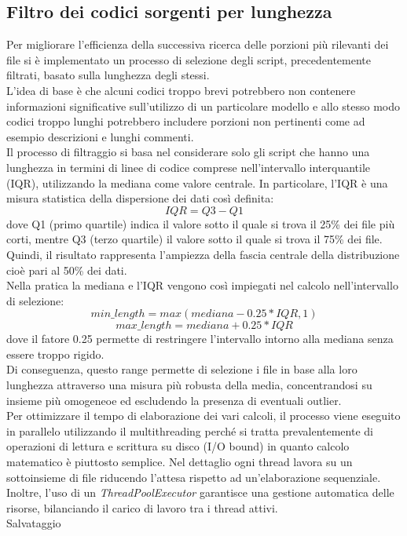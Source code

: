 \documentclass{article}
\begin{document}
\subsection{Filtro dei codici sorgenti per lunghezza}
Per migliorare l'efficienza della successiva ricerca delle porzioni più rilevanti dei file si è implementato un processo di selezione degli script, precedentemente filtrati, basato sulla lunghezza degli stessi.\\
L'idea di base è che alcuni codici troppo brevi potrebbero non contenere informazioni significative sull'utilizzo di un particolare modello e allo stesso modo codici troppo lunghi potrebbero includere porzioni non pertinenti come ad esempio descrizioni e lunghi commenti.\\
Il processo di filtraggio si basa nel considerare solo gli script che hanno una lunghezza in termini di linee di codice comprese nell'intervallo interquantile (IQR), utilizzando la mediana come valore centrale. In particolare, l'IQR è una misura statistica della dispersione dei dati così definita:
\[
IQR = Q3 - Q1
\]
dove Q1 (primo quartile) indica il valore sotto il quale si trova il 25\% dei file più corti, mentre Q3 (terzo quartile) il valore sotto il quale si trova il 75\% dei file. Quindi, il risultato rappresenta l'ampiezza della fascia centrale della distribuzione cioè pari al 50\% dei dati.\\
Nella pratica la mediana e l'IQR vengono così impiegati nel calcolo nell'intervallo di selezione:
\[
min\_length =max(mediana-0.25*IQR,1)
\]
\[
max\_length =mediana+0.25*IQR
\]
dove il fatore 0.25 permette di restringere l'intervallo intorno alla mediana senza essere troppo rigido.\\
Di conseguenza, questo range permette di selezione i file in base alla loro lunghezza attraverso una misura più robusta della media, concentrandosi su insieme più omogeneoe ed escludendo la presenza di eventuali outlier.\\
Per ottimizzare il tempo di elaborazione dei vari calcoli, il processo viene eseguito in parallelo utilizzando il multithreading perché si tratta prevalentemente di operazioni di lettura e scrittura su disco (I/O bound) in quanto calcolo matematico è piuttosto semplice. Nel dettaglio ogni thread lavora su un sottoinsieme di file riducendo l'attesa rispetto ad un'elaborazione sequenziale. Inoltre, l'uso di un \textit{ThreadPoolExecutor}\cite{python-concurrent-futures} garantisce una gestione automatica delle risorse, bilanciando il carico di lavoro tra i thread attivi.\\
Salvataggio
\end{document}
